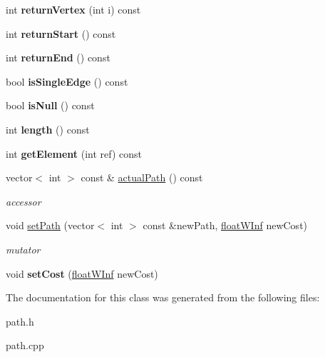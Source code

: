 \begin{DoxyCompactItemize}
\item 
\hypertarget{classpath_a04e26e757e62c2d712b469c95e2a9212}{
int {\bfseries returnVertex} (int i) const }
\label{classpath_a04e26e757e62c2d712b469c95e2a9212}

\item 
\hypertarget{classpath_a32f99d8c96a8e307f69bc86b62a6bbc7}{
int {\bfseries returnStart} () const }
\label{classpath_a32f99d8c96a8e307f69bc86b62a6bbc7}

\item 
\hypertarget{classpath_a624821fa76d462773720cd33df99208c}{
int {\bfseries returnEnd} () const }
\label{classpath_a624821fa76d462773720cd33df99208c}

\item 
\hypertarget{classpath_a6c1d3b80529a2f3b66b62b86403e21ff}{
bool {\bfseries isSingleEdge} () const }
\label{classpath_a6c1d3b80529a2f3b66b62b86403e21ff}

\item 
\hypertarget{classpath_a597e2dc92dff556ec66a8da807052947}{
bool {\bfseries isNull} () const }
\label{classpath_a597e2dc92dff556ec66a8da807052947}

\item 
\hypertarget{classpath_a4e1521b9f5d84ee3718d90e5fc8aa48d}{
int {\bfseries length} () const }
\label{classpath_a4e1521b9f5d84ee3718d90e5fc8aa48d}

\item 
\hypertarget{classpath_a7827e0cd14cbe32961c1a499987c2879}{
int {\bfseries getElement} (int ref) const }
\label{classpath_a7827e0cd14cbe32961c1a499987c2879}

\item 
\hypertarget{classpath_a95bc925160e72e997df3f6066be4d03e}{
vector$<$ int $>$ const \& \hyperlink{classpath_a95bc925160e72e997df3f6066be4d03e}{actualPath} () const }
\label{classpath_a95bc925160e72e997df3f6066be4d03e}

\begin{DoxyCompactList}\small\item\em accessor \end{DoxyCompactList}\item 
\hypertarget{classpath_a1e9134ba599abb095047e436db469d26}{
void \hyperlink{classpath_a1e9134ba599abb095047e436db469d26}{setPath} (vector$<$ int $>$ const \&newPath, \hyperlink{classfloatWInf}{floatWInf} newCost)}
\label{classpath_a1e9134ba599abb095047e436db469d26}

\begin{DoxyCompactList}\small\item\em mutator \end{DoxyCompactList}\item 
\hypertarget{classpath_a493daad3b0cd149295ec6e87babb21a3}{
void {\bfseries setCost} (\hyperlink{classfloatWInf}{floatWInf} newCost)}
\label{classpath_a493daad3b0cd149295ec6e87babb21a3}

\end{DoxyCompactItemize}


The documentation for this class was generated from the following files:\begin{DoxyCompactItemize}
\item 
path.h\item 
path.cpp\end{DoxyCompactItemize}
